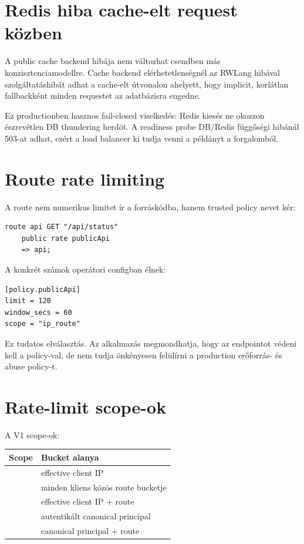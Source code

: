\section{Redis hiba cache-elt request közben}

A public cache backend hibája nem változhat csendben más konzisztenciamodellre. Cache backend elérhetetlenségnél az RWLang  hibával szolgáltatáshibát adhat a cache-elt útvonalon ahelyett, hogy implicit, korlátlan fallbackként minden requestet az adatbázisra engedne.

Ez productionben hasznos fail-closed viselkedés: Redis kiesés ne okozzon észrevétlen DB thundering herdöt. A readiness probe DB/Redis függőségi hibánál 503-at adhat, ezért a load balancer ki tudja venni a példányt a forgalomból.

\section{Route rate limiting}

A route nem numerikus limitet ír a forráskódba, hanem trusted policy nevet kér:

\begin{lstlisting}[language=RWLang]
route api GET "/api/status"
    public rate publicApi
    => api;
\end{lstlisting}

A konkrét számok operátori configban élnek:

\begin{lstlisting}
[policy.publicApi]
limit = 120
window_secs = 60
scope = "ip_route"
\end{lstlisting}

Ez tudatos elválasztás. Az alkalmazás megmondhatja, hogy az endpointot védeni kell a  policy-val, de nem tudja önkényesen felülírni a production erőforrás- és abuse policy-t.

\section{Rate-limit scope-ok}

A V1 scope-ok:

\begin{center}
\begin{tabularx}{\textwidth}{@{}L{0.22\textwidth}Y@{}}
\toprule
\textbf{Scope} & \textbf{Bucket alanya} \\
\midrule
{} & effective client IP \\
 & minden kliens közös route bucketje \\
 & effective client IP + route \\
 & autentikált canonical principal \\
 & canonical principal + route \\
\bottomrule
\end{tabularx}
\end{center}

